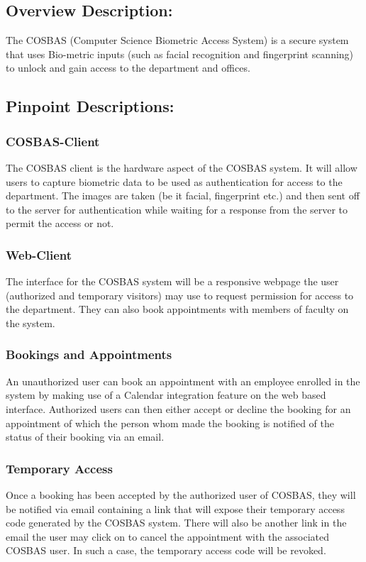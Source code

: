 \subsection{Overview Description:}
	The COSBAS (Computer Science Biometric Access System) is a secure system that uses Bio-metric inputs (such as facial recognition and fingerprint scanning) to unlock and gain access to the department and offices.
	
\subsection{Pinpoint Descriptions:}
	\subsubsection{COSBAS-Client}
	The COSBAS client is the hardware aspect of the COSBAS system. It will allow users to capture biometric data to be used as authentication for access to the department. The images are taken (be it facial, fingerprint etc.) and then sent off to the server for authentication while waiting for a response from the server to permit the access or not.
	
	\subsubsection{Web-Client}
	The interface for the COSBAS system will be a responsive webpage the user (authorized and temporary visitors) may use to request permission for access to the department. They can also book appointments with members of faculty on the system.
	
	\subsubsection{Bookings and Appointments}
	An unauthorized user can book an appointment with an employee enrolled in the system by making use of a Calendar integration feature on the web based interface. Authorized users can then either accept or decline the booking for an appointment of which the person whom made the booking is notified of the status of their booking via an email.
	
	\subsubsection{Temporary Access}
	Once a booking has been accepted by the authorized user of COSBAS, they will be notified via email containing a link that will expose their temporary access code generated by the COSBAS system. There will also be another link in the email the user may click on to cancel the appointment with the associated COSBAS user. In such a case, the temporary access code will be revoked.